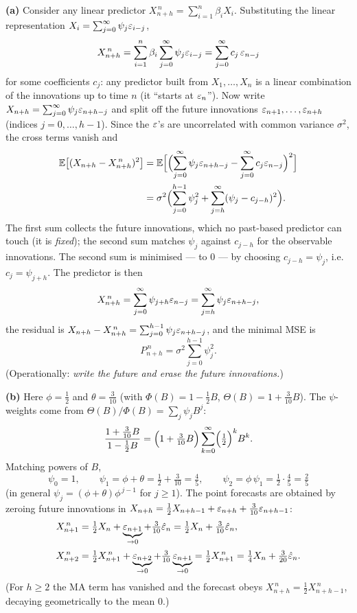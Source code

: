 \documentclass[11pt]{article}
\begin{document}
\textbf{(a)} Consider any linear predictor $X^{\,n}_{n+h}=\sum_{i=1}^n\beta_iX_i$. Substituting the linear representation $X_i=\sum_{j=0}^\infty\psi_j\varepsilon_{i-j}$,
\[
X^{\,n}_{n+h}=\sum_{i=1}^n\beta_i\sum_{j=0}^\infty\psi_j\varepsilon_{i-j}=\sum_{j=0}^\infty c_j\,\varepsilon_{n-j}
\]
for some coefficients $c_j$: any predictor built from $X_1,\dots,X_n$ is a linear combination of the innovations up to time $n$ (it ``starts at $\varepsilon_n$''). Now write $X_{n+h}=\sum_{j=0}^\infty\psi_j\varepsilon_{n+h-j}$ and split off the future innovations $\varepsilon_{n+1},\dots,\varepsilon_{n+h}$ (indices $j=0,\dots,h-1$). Since the $\varepsilon$'s are uncorrelated with common variance $\sigma^2$, the cross terms vanish and
\[
\begin{aligned}
\mathbb{E}\bigl[(X_{n+h}-X^{\,n}_{n+h})^2\bigr]
&=\mathbb{E}\Bigl[\Bigl(\sum_{j=0}^\infty\psi_j\varepsilon_{n+h-j}-\sum_{j=0}^\infty c_j\varepsilon_{n-j}\Bigr)^2\Bigr]\\
&=\sigma^2\Bigl(\sum_{j=0}^{h-1}\psi_j^2+\sum_{j=h}^\infty(\psi_j-c_{j-h})^2\Bigr).
\end{aligned}
\]
The first sum collects the future innovations, which no past-based predictor can touch (it is \emph{fixed}); the second sum matches $\psi_j$ against $c_{j-h}$ for the observable innovations. The second sum is minimised --- to $0$ --- by choosing $c_{j-h}=\psi_j$, i.e.\ $c_j=\psi_{j+h}$. The predictor is then
\[
X^{\,n}_{n+h}=\sum_{j=0}^\infty\psi_{j+h}\varepsilon_{n-j}=\sum_{j=h}^\infty\psi_j\varepsilon_{n+h-j},
\]
the residual is $X_{n+h}-X^{\,n}_{n+h}=\sum_{j=0}^{h-1}\psi_j\varepsilon_{n+h-j}$, and the minimal MSE is
\[
P^{\,n}_{n+h}=\sigma^2\sum_{j=0}^{h-1}\psi_j^2 .
\]
(Operationally: \emph{write the future and erase the future innovations.})

\textbf{(b)} Here $\phi=\tfrac12$ and $\theta=\tfrac{3}{10}$ (with $\Phi(B)=1-\tfrac12B$, $\Theta(B)=1+\tfrac{3}{10}B$). The $\psi$-weights come from $\Theta(B)/\Phi(B)=\sum_j\psi_jB^j$:
\[
\frac{1+\tfrac{3}{10}B}{1-\tfrac12 B}
=\Bigl(1+\tfrac{3}{10}B\Bigr)\sum_{k=0}^\infty\Bigl(\tfrac12\Bigr)^k B^k .
\]
Matching powers of $B$,
\[
\psi_0=1,\qquad
\psi_1=\phi+\theta=\tfrac12+\tfrac{3}{10}=\tfrac{4}{5},\qquad
\psi_2=\phi\,\psi_1=\tfrac12\cdot\tfrac45=\tfrac25
\]
(in general $\psi_j=(\phi+\theta)\phi^{\,j-1}$ for $j\ge1$). The point forecasts are obtained by zeroing future innovations in $X_{n+h}=\tfrac12X_{n+h-1}+\varepsilon_{n+h}+\tfrac{3}{10}\varepsilon_{n+h-1}$:
\[
\begin{aligned}
X^{\,n}_{n+1}&=\tfrac12 X_n+\underbrace{\varepsilon_{n+1}}_{\to0}+\tfrac{3}{10}\hat{\varepsilon}_n
=\tfrac12 X_n+\tfrac{3}{10}\hat{\varepsilon}_n,\\[2pt]
X^{\,n}_{n+2}&=\tfrac12 X^{\,n}_{n+1}+\underbrace{\varepsilon_{n+2}}_{\to0}+\tfrac{3}{10}\underbrace{\varepsilon_{n+1}}_{\to0}
=\tfrac12 X^{\,n}_{n+1}=\tfrac14 X_n+\tfrac{3}{20}\hat{\varepsilon}_n .
\end{aligned}
\]
(For $h\ge2$ the MA term has vanished and the forecast obeys $X^{\,n}_{n+h}=\tfrac12 X^{\,n}_{n+h-1}$, decaying geometrically to the mean $0$.)
\end{document}
